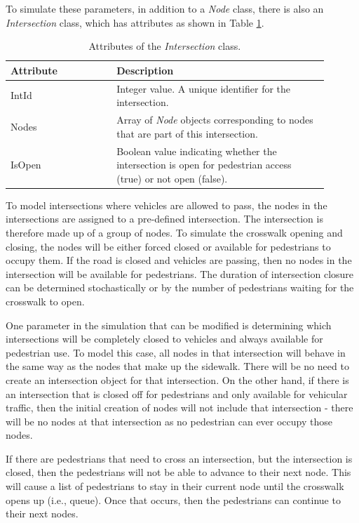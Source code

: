 \documentclass[12pt]{article}
\begin{document}
To simulate these parameters, in addition to a \textit{Node} class, there is
also an \textit{Intersection} class, which has attributes as shown in Table
\ref{table:intersection}.

\def\arraystretch{1.5}
\begin{table}[hb!]
  \centering
    \begin{tabular}{p{0.3\linewidth}p{0.6\linewidth}}
     \hline
     Attribute & Description \\
     \hline
     IntId & Integer value. A unique identifier for the intersection. \\
     Nodes & Array of \textit{Node} objects corresponding to nodes
             that are part of this intersection. \\
     IsOpen  & Boolean value indicating whether the intersection is open
             for pedestrian access (true) or not open (false). \\
     \hline
    \end{tabular}
    \caption{Attributes of the \textit{Intersection} class.}
  \label{table:intersection}
\end{table}

To model intersections where vehicles are allowed to pass, the nodes in the
intersections are assigned to a pre-defined intersection. The intersection
is therefore made up of a group of nodes. To simulate the crosswalk opening and
closing, the nodes will be either forced closed or available for pedestrians to
occupy them. If the road is closed and vehicles are passing, then no nodes in
the intersection will be available for pedestrians. The duration of
intersection closure can be determined stochastically or by the number of
pedestrians waiting for the crosswalk to open.

One parameter in the simulation that can be modified is determining which
intersections will be completely closed to vehicles and always available for
pedestrian use. To model this case, all nodes in that intersection will behave
in the same way as the nodes that make up the sidewalk. There will be no need to
create an intersection object for that intersection. On the other hand, if there
is an intersection that is closed off for pedestrians and only available for
vehicular traffic, then the initial creation of nodes will not include that
intersection - there will be no nodes at that intersection as no pedestrian can
ever occupy those nodes.

If there are pedestrians that need to cross an intersection, but the
intersection is closed, then the pedestrians will not be able to advance to
their next node. This will cause a list of pedestrians to stay in their
current node until the crosswalk opens up (i.e., queue). Once that occurs, then
the pedestrians can continue to their next nodes.
\end{document}
